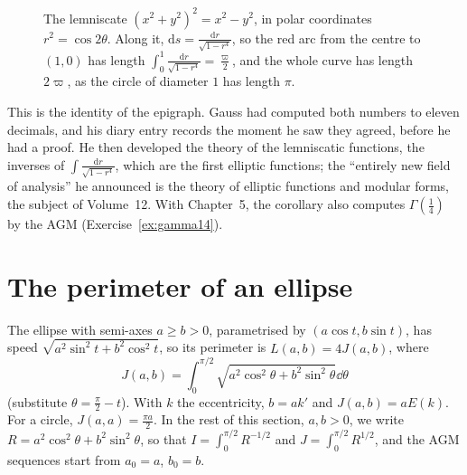 \begin{figure}[ht]
\centering
{}
\caption{The lemniscate $(x^2+y^2)^2=x^2-y^2$, in polar coordinates $r^2=\cos2\theta$. Along it, $\mathrm ds=\frac{\mathrm dr}{\sqrt{1-r^4}}$, so the red arc from the centre to
$(1,0)$ has length $\int_0^1\frac{\mathrm dr}{\sqrt{1-r^4}}=\frac\varpi2$, and the whole curve has length $2\varpi$, as the circle of diameter $1$ has length $\pi$.}
\label{fig:lemniscate}
\end{figure}

\begin{beauty}
This is the identity of the epigraph. Gauss had computed both numbers to eleven decimals, and his diary entry records the moment he saw
they agreed, before he had a proof. He then developed the theory of the lemniscatic functions, the inverses of $\int\frac{\mathrm dr}{\sqrt{1-r^4}}$, which are
the first elliptic functions; the ``entirely new field of analysis'' he announced is the theory of elliptic functions and modular forms, the subject
of Volume~12. With Chapter~5, the corollary also computes $\Gamma(\frac14)$ by the AGM (Exercise~\ref{ex:gamma14}).
\end{beauty}

\section{The perimeter of an ellipse}

The ellipse with semi-axes $a\ge b>0$, parametrised by $(a\cos t,b\sin t)$, has speed $\sqrt{a^2\sin^2t+b^2\cos^2t}$, so its perimeter is $L(a,b)=4J(a,b)$, where
\[
J(a,b)=\int_0^{\pi/2}\sqrt{a^2\cos^2\theta+b^2\sin^2\theta}\dd\theta
\]
(substitute $\theta=\frac\pi2-t$). With $k$ the eccentricity, $b=ak'$ and $J(a,b)=aE(k)$. For a circle, $J(a,a)=\frac{\pi a}2$. In the rest of this section, $a,b>0$, we write
$R=a^2\cos^2\theta+b^2\sin^2\theta$, so that $I=\int_0^{\pi/2}R^{-1/2}$ and $J=\int_0^{\pi/2}R^{1/2}$, and the AGM sequences start from $a_0=a$, $b_0=b$.

